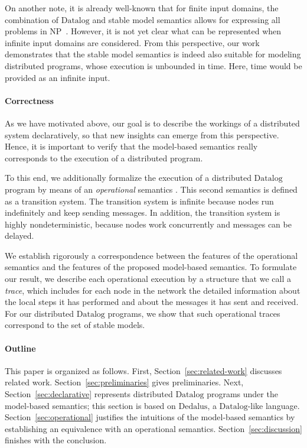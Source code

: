 \documentclass{tlp}
\newcommand{\langname}[1]{\text{#1}}  \newcommand{\pred}[1]{\mathtt{#1}}  \newcommand{\fname}[1]{\mathit{#1}}  \newcommand{\sq}[1]{`{#1}'}
\newcommand{\dedalus}{\langname{Dedalus}}
\newcommand{\datalog}{\langname{Datalog}}
\begin{document}
On another note, it is already well-known that for finite input domains,
the combination of $\datalog$ and stable model semantics allows for
expressing all problems in NP~\cite{marek_stable}. However, it is
not yet clear what can be represented when infinite input domains
are considered. From this perspective, our work demonstrates that
the stable model semantics is indeed also suitable for modeling distributed
programs, whose execution is unbounded in time. Here, time would be
provided as an infinite input. 


\paragraph{Correctness}

As we have motivated above, our goal is to describe the workings of
a distributed system declaratively, so that new insights can emerge
from this perspective. Hence, it is important to verify that the model-based
semantics really corresponds to the execution of a distributed program.

To this end, we additionally formalize the execution of a distributed
$\datalog$ program by means of an \emph{operational} semantics
\cite{deutsch_network,declnetw_opsem,grumbach_netlog,rtdn_pods}.
This second semantics is defined as a transition system. The transition
system is infinite because nodes run indefinitely and keep sending
messages. In addition, the transition system is highly nondeterministic,
because nodes work concurrently and messages can be delayed.

We establish rigorously a correspondence between the features of the
operational semantics and the features of the proposed model-based
semantics. To formulate our result, we describe each operational execution
by a structure that we call a \emph{trace}, which includes for each node in the network the detailed information about the local
steps it has performed and about the messages it has sent and received.
For our distributed $\datalog$ programs, we show that such operational
traces correspond to the set of stable models.




\paragraph*{Outline}

This paper is organized as follows. First, Section~\ref{sec:related-work}
discusses related work. Section~\ref{sec:preliminaries} gives preliminaries.
Next, Section~\ref{sec:declarative} represents distributed $\datalog$
programs under the model-based semantics; this section is based on $\dedalus$, a $\datalog$-like language.
Section~\ref{sec:operational}
justifies the intuitions of the model-based semantics by establishing
an equivalence with an operational semantics. Section~\ref{sec:discussion}
finishes with the conclusion.
\end{document}
